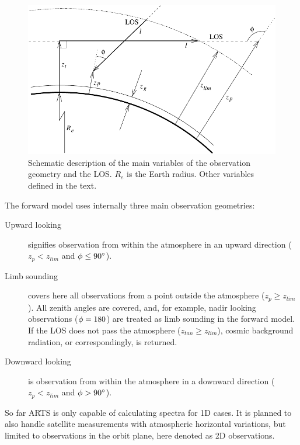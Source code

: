   \begin{figure}[tb]
   \begin{center}
    \includegraphics*[width=0.95\hsize]{Figs/geoms}
    \caption{Schematic description of the main variables of the 
             observation geometry and the LOS. $R_e$ is the Earth
             radius. Other variables defined in the text.}  
    \label{fig:los1d:geoms}  
   \end{center}
  \end{figure}
  
  The forward model uses internally three main observation geometries:

  \begin{description}
  \item[Upward looking] signifies observation from
    within the atmosphere in an upward direction ($z_p<z_{lim}$ and
    $\phi\leq90^{\circ}$). 
  \item[Limb sounding] covers here all observations from a point
    outside the atmosphere ($z_p \geq z_{lim}$). All zenith angles are
    covered, and, for example, nadir looking observations
    ($\phi=180$) are treated as limb sounding in the forward model.
    If the LOS does not pass the atmosphere ($z_{tan} \geq z_{lim}$),
    cosmic background radiation, or correspondingly, is returned.
  \item[Downward looking] is observation from within the atmosphere in
    a downward direction ($z_p<z_{lim}$ and $\phi>90^{\circ}$).
  \end{description}
 

 \label{sec:los:2d}
 So far ARTS is only capable of calculating spectra for 1D cases.
 It is planned to also handle satellite measurements with atmospheric 
 horizontal variations, but limited to observations in the orbit
 plane, here denoted as 2D observations. 
 

